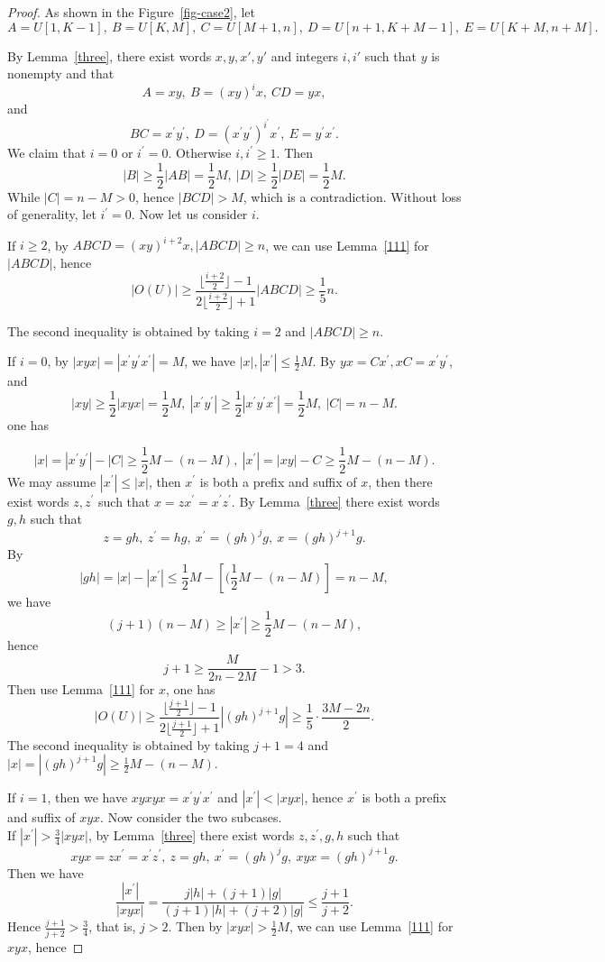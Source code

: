 \documentclass[runningheads,envcountsame,a4paper]{llncs}
\begin{document}
\begin{proof}
As shown in the Figure~\ref{fig-case2}, let
$$A=U[1,K-1],\ B=U[K,M],\ C=U[M+1,n],\ D=U[n+1,K+M-1],\ E=U[K+M,n+M].$$

By Lemma~\ref{three}, there exist words $x,y,x',y'$ and integers $i,i'$ such that $y$ is nonempty and that
$$A=xy,\ B=(xy)^ix,\ CD=yx,$$
and 
$$BC=x^{\prime} y^{\prime},\ D=(x^{\prime} y^{\prime})^{i^{\prime}}x^{\prime},\ E=y^{\prime}x^{\prime}.$$
We claim that $i=0$ or $i^{\prime}=0$. Otherwise $i,i^{\prime}\ge1$. Then
$$|B|\ge\frac12 |AB|=\frac12 M,\ |D|\ge\frac12 |DE|=\frac12 M.$$ While $|C|=n-M>0$, hence $|BCD|>M$, which is a contradiction. Without loss of generality, let $i^{\prime}=0$. Now let us consider $i$.

If $i\ge 2$, by $ABCD=(xy)^{i+2}x,|ABCD|\ge n$, we can use Lemma~\ref{111} for $|ABCD|$, hence 
$$|O(U)|\ge \frac{\lfloor \frac {i+2}2 \rfloor-1}{2\lfloor \frac {i+2}2 \rfloor+1}|ABCD|\ge\frac15 n.$$

The second inequality is obtained by taking $i=2$ and $|ABCD|\geq n$.

If $i=0$, by $|xyx|=|x^{\prime}y^{\prime}x^{\prime}|=M$, we have $|x|,|x^{\prime}|\le \frac12 M$. By $yx=Cx^{\prime},xC=x^{\prime}y^{\prime}$, and
$$|xy|\ge\frac12 |xyx|=\frac12 M,\ |x^{\prime}y^{\prime}|\ge\frac12 |x^{\prime}y^{\prime}x^{\prime}|=\frac12 M,\ |C|=n-M.$$
one has

$$|x|=|x^{\prime}y^{\prime}|-|C|\ge\frac12 M-(n-M),\ |x^{\prime}|=|xy|-C\ge \frac12 M-(n-M).$$
We may assume $|x^{\prime}|\le |x|$, then $x^{\prime}$ is both a prefix and suffix of $x$, then there exist words $z,z^{\prime}$ such that $x=zx^{\prime}=x^{\prime}z^{\prime}$. By Lemma~\ref{three} there exist words $g,h$ such that 
$$z=gh,\ z^{\prime}=hg,\ x^{\prime}=(gh)^jg,\ x=(gh)^{j+1}g.$$ 
By $$|gh|=|x|-|x^{\prime}|\le \frac12M-[(\frac12M-(n-M)]= n-M,$$ 
we have 
$$(j+1)(n-M)\ge |x^{\prime}|\ge \frac12 M-(n-M),$$
hence 
$$j+1\ge \frac{M}{2n-2M}-1>3.$$
Then use Lemma~\ref{111} for $x$, one has
$$|O(U)|\ge \frac{\lfloor \frac {j+1}2 \rfloor-1}{2\lfloor \frac {j+1}2 \rfloor+1}|(gh)^{j+1}g|\geq\frac{1}{5}\cdot\frac{3M-2n}{2}.$$
The second inequality is obtained by taking $j+1=4$ and $|x|=|(gh)^{j+1}g|\ge\frac12 M-(n-M)$.

If $i=1$, then we have $xyxyx=x^{\prime}y^{\prime}x^{\prime}$ and $|x^{\prime}|<|xyx|$, hence $x^{\prime}$ is both a prefix and suffix of $xyx$. Now consider the two subcases.\\

If $|x^{\prime}|>\frac34 |xyx|$, by Lemma~\ref{three} there exist words $z,z^{\prime},g,h$ such that
$$xyx=zx^{\prime}=x^{\prime}z^{\prime},\ z=gh,\ x^{\prime}=(gh)^jg,\ xyx=(gh)^{j+1}g.$$ Then we have
$$\frac{|x^{\prime}|}{|xyx|}=\frac{j|h|+(j+1)|g|}{(j+1)|h|+(j+2)|g|}\le \frac{j+1}{j+2}.$$ 
Hence $\frac{j+1}{j+2}>\frac34$, that is, $j>2$. Then by $|xyx|>\frac12M$, we can use Lemma~\ref{111} for $xyx$, hence



\end{proof}
\end{document}
